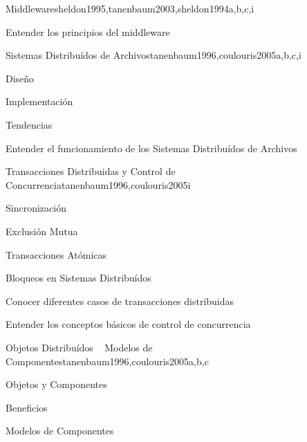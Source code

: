 \begin{syllabus}
\begin{unit}{Middleware}{sheldon1995,tanenbaum2003,sheldon1994}{a,b,c,i}
   \begin{learningoutcomes}
      \item Entender los principios del middleware
   \end{learningoutcomes}
\end{unit}

\begin{unit}{Sistemas Distribuídos de Archivos}{tanenbaum1996,coulouris2005}{a,b,c,i}
   \begin{topics}
      \item Diseño
      \item Implementación
      \item Tendencias
   \end{topics}

   \begin{learningoutcomes}
      \item Entender el funcionamiento de los Sistemas Distribuídos de Archivos
   \end{learningoutcomes}
\end{unit}

\begin{unit}{Transacciones Distribuidas y Control de Concurrencia}{tanenbaum1996,coulouris2005}{i}
   \begin{topics}
      \item Sincronización
      \item Exclusión Mutua
      \item Transacciones Atómicas
      \item Bloqueos en Sistemas Distribuídos
   \end{topics}

   \begin{learningoutcomes}
      \item Conocer diferentes casos de transacciones distribuidas
      \item Entender los conceptos básicos de control de concurrencia
      \item 
   \end{learningoutcomes}
\end{unit}

\begin{unit}{Objetos Distribuídos ~ Modelos de Componentes}{tanenbaum1996,coulouris2005}{a,b,c}
   \begin{topics}
      \item Objetos y Componentes
      \item Beneficios
      \item Modelos de Componentes
   \end{topics}


\end{unit}
\end{syllabus}
